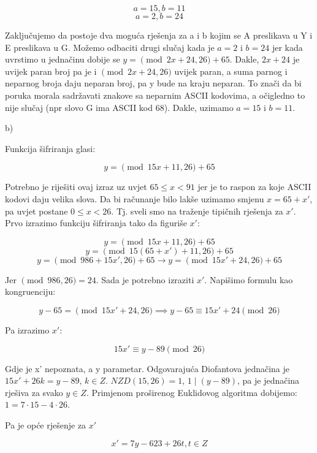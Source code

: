 \documentclass[12pt]{article}
\begin{document}
$$a = 15, b = 11$$
$$a = 2, b = 24$$\vspace{1mm}

Zaključujemo da postoje dva moguća rješenja za a i b kojim se A preslikava u Y i E preslikava u G. Možemo odbaciti drugi slučaj kada je $a = 2$ i $b = 24$ jer kada uvrstimo u jednačinu dobije se $y = \pmod{2x + 24, 26} + 65$. Dakle, $2x + 24$ je uvijek paran broj pa je i $\pmod{2x + 24, 26}$ uvijek paran, a suma parnog i neparnog broja daju neparan broj, pa y bude na kraju neparan. To znači da bi poruka morala sadržavati znakove sa neparnim ASCII kodovima, a očigledno to nije slučaj (npr slovo G ima ASCII kod 68). Dakle, uzimamo $a = 15$ i $b = 11$.\vspace{10mm}

b)

\hspace{0.65cm}Funkcija šifriranja glasi:

$$y = \pmod{15x + 11, 26} + 65$$\vspace{1mm}

Potrebno je riješiti ovaj izraz uz uvjet $65 \leq x < 91$ jer je to raspon za koje ASCII kodovi daju velika slova. Da bi računanje bilo lakše uzimamo smjenu $x = 65 + x'$, pa uvjet postane $0 \leq x < 26$. Tj. sveli smo na traženje tipičnih rješenja za $x'$. Prvo izrazimo funkciju šifriranja tako da figuriše $x'$:

$$y = \pmod{15x + 11, 26} + 65$$
$$y = \pmod{15(65 + x') + 11, 26} + 65$$
$$y = \pmod{986 + 15x', 26} + 65 \to y = \pmod{15x' + 24, 26} + 65$$\vspace{1mm}


Jer $\pmod{986, 26} = 24$. Sada je potrebno izraziti $x'$. Napišimo formulu kao kongruenciju:

$$y - 65  = \pmod{15x' + 24, 26} \implies y - 65 \equiv 15x' + 24 \pmod{26}$$\vspace{1mm}

Pa izrazimo $x'$:

$$15x' \equiv y - 89\pmod{26}$$\vspace{1mm}

Gdje je x' nepoznata, a y parametar. Odgovarajuća Diofantova jednačina je $15x' + 26k = y - 89$, $k \in Z$. $NZD(15, 26) = 1$, $1 \mid (y - 89)$, pa je jednačina rješiva za svako $y \in Z$. Primjenom proširenog Euklidovog algoritma dobijemo: $1 = 7\cdot 15 - 4\cdot 26$.

Pa je opće rješenje za $x'$

$$x' = 7y - 623 + 26t, t \in Z$$\vspace{1mm}
\end{document}
